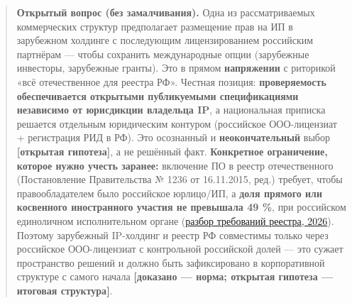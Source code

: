 \documentclass[
  russian,
]{article}
\begin{document}
\begin{quote}
\textbf{Открытый вопрос (без замалчивания).} Одна из рассматриваемых
коммерческих структур предполагает размещение прав на ИП в зарубежном
холдинге с последующим лицензированием российским партнёрам --- чтобы
сохранить международные опции (зарубежные инвесторы, зарубежные
гранты). Это в прямом \textbf{напряжении} с риторикой «всё отечественное
для реестра РФ». Честная позиция: \textbf{проверяемость обеспечивается
открытыми публикуемыми спецификациями независимо от юрисдикции владельца
IP}, а национальная приписка решается отдельным юридическим контуром
(российское ООО-лицензиат + регистрация РИД в РФ). Это осознанный и
\textbf{неокончательный} выбор \textbf{{[}открытая гипотеза{]}}, а не
решённый факт. \textbf{Конкретное ограничение, которое нужно учесть
заранее:} включение ПО в реестр отечественного (Постановление
Правительства № 1236 от 16.11.2015, ред.) требует, чтобы
правообладателем было российское юрлицо/ИП, а \textbf{доля прямого или
косвенного иностранного участия не превышала 49 \%}, при российском
единоличном исполнительном органе
(\href{https://terabit.ai/research/edinyj-reestr-rossijskogo-po-polnoe-rukovodstvo-po-registracii-i-meram-gospodderzhki}{разбор
требований реестра, 2026}). Поэтому зарубежный IP-холдинг и реестр РФ
совместимы только через российское ООО-лицензиат с контрольной
российской долей --- это сужает пространство решений и должно быть
зафиксировано в корпоративной структуре с самого начала
\textbf{{[}доказано --- норма; открытая гипотеза --- итоговая
структура{]}}.
\end{quote}
\end{document}
